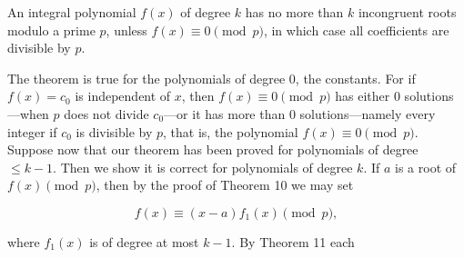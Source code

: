 An integral polynomial $f(x)$ of degree $k$ has no more than $k$ incongruent roots modulo a prime $p$, unless $f(x) \equiv 0 \pmod{p}$, in which case all coefficients are divisible by $p$.

The theorem is true for the polynomials of degree 0, the constants. For if $f(x) = c_0$ is independent of $x$, then $f(x) \equiv 0 \pmod{p}$ has either 0 solutions—when $p$ does not divide $c_0$—or it has more than 0 solutions—namely every integer if $c_0$ is divisible by $p$, that is, the polynomial $f(x) \equiv 0 \pmod{p}$. Suppose now that our theorem has been proved for polynomials of degree $\leq k - 1$. Then we show it is correct for polynomials of degree $k$. If $a$ is a root of $f(x) \pmod{p}$, then by the proof of Theorem 10 we may set

$$f(x) \equiv (x - a)f_1(x) \pmod{p},$$

where $f_1(x)$ is of degree at most $k - 1$. By Theorem 11 each
